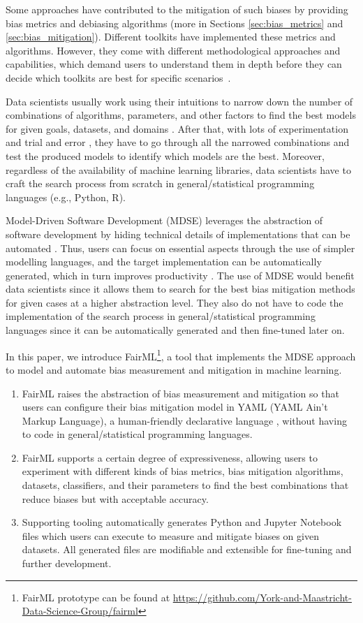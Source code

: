 \documentclass[sigconf,review]{acmart}
\begin{document}
	Some approaches have contributed to the mitigation of such biases by providing bias metrics and debiasing algorithms (more in Sections \ref{sec:bias_metrics} and \ref{sec:bias_mitigation}). 
	Different toolkits have implemented these metrics and algorithms.
	However, they come with different methodological approaches and capabilities, which demand users to understand them in depth before they can decide which toolkits are best for specific scenarios~\cite{lee2021landscape}.  
	
	Data scientists usually work using their intuitions to narrow down the number of combinations of algorithms, parameters, and other factors to find the best models for given goals, datasets, and domains \cite{muller2016introduction}. After that, with lots of experimentation and trial and error \cite{byrne2017development}, they have to go through all the narrowed combinations and test the produced models to identify which models are the best. Moreover, regardless of the availability of machine learning libraries, data scientists have to craft the search process from scratch in general/statistical programming languages (e.g., Python, R).
	
	Model-Driven Software Development (MDSE) leverages the abstraction of software development by hiding technical details of implementations that can be automated \cite{brambilla2017model}. Thus, users can focus on essential aspects through the use of simpler modelling languages, and the target implementation can be automatically generated, which in turn improves productivity \cite{volter2013model}. The use of MDSE would benefit data scientists since it allows them to search for the best bias mitigation methods for given cases at a higher abstraction level. They also do not have to code the implementation of the search process in general/statistical programming languages since it can be automatically generated and then fine-tuned later on. 
	
	In this paper, we introduce FairML\footnote{FairML prototype can be found at \url{https://github.com/York-and-Maastricht-Data-Science-Group/fairml}}, a tool that implements the MDSE approach to model and automate bias measurement and mitigation in machine learning. 
	\begin{enumerate}
		\item FairML raises the abstraction of bias measurement and mitigation so that users can configure their bias mitigation model in YAML (YAML Ain't Markup Language), a human-friendly declarative language \cite{evans2017yaml}, without having to code in general/statistical programming languages.
		\item FairML supports a certain degree of expressiveness, allowing users to experiment with different kinds of bias metrics, bias mitigation algorithms, datasets, classifiers, and their parameters to find the best combinations that reduce biases but with acceptable accuracy.
		\item Supporting tooling automatically generates Python and Jupyter Notebook files which users can execute to measure and mitigate biases on given datasets. All generated files are modifiable and extensible for fine-tuning and further development. 
	\end{enumerate}
	
\end{document}
